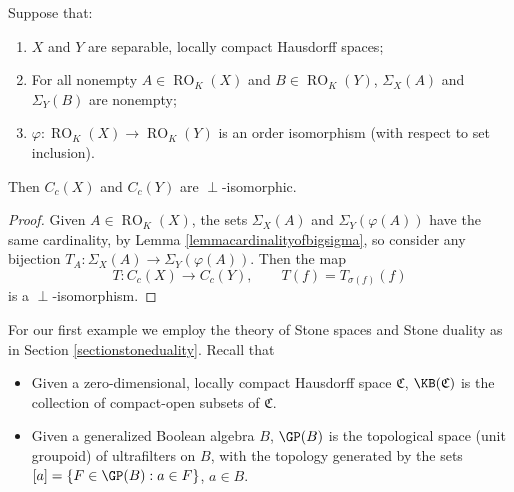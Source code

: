 \begin{theorem}\label{theoremperpisnotenough}
	Suppose that:
	\begin{enumerate}
		\item $X$ and $Y$ are separable, locally compact Hausdorff spaces;
		\item For all nonempty $A\in\operatorname{RO}_K(X)$ and $B\in\operatorname{RO}_K(Y)$, $\Sigma_X(A)$ and $\Sigma_Y(B)$ are nonempty;
		\item $\varphi:\operatorname{RO}_K(X)\to\operatorname{RO}_K(Y)$ is an order isomorphism (with respect to set inclusion).
	\end{enumerate}
	Then $C_c(X)$ and $C_c(Y)$ are $\perp$-isomorphic.
\end{theorem}
\begin{proof}
	Given $A\in\operatorname{RO}_K(X)$, the sets  $\Sigma_X(A)$ and $\Sigma_Y(\varphi(A))$ have the same cardinality, by Lemma \ref{lemmacardinalityofbigsigma}, so consider any bijection $T_A:\Sigma_X(A)\to\Sigma_Y(\varphi(A))$. Then the map
	\[T:C_c(X)\to C_c(Y),\qquad T(f)=T_{\sigma(f)}(f)\]
	is a $\perp$-isomorphism.\qedhere
\end{proof}

For our first example we employ the theory of Stone spaces and Stone duality as in Section \ref{sectionstoneduality}. Recall that
\begin{itemize}
	\item Given a zero-dimensional, locally compact Hausdorff space $\mathfrak{C}$, $\KB(\mathfrak{C})$ is the collection of compact-open subsets of $\mathfrak{C}$.
	\item Given a generalized Boolean algebra $B$, $\GP(B)$ is the topological space (unit groupoid) of ultrafilters on $B$, with the topology generated by the sets $[a]=\left\{F\in\GP(B):a\in F\right\}$, $a\in B$.
\end{itemize}

